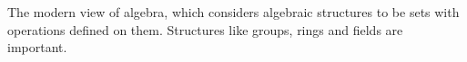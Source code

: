 The modern view of algebra, which considers algebraic structures to be sets
with operations defined on them. Structures like groups, rings and
fields are important.